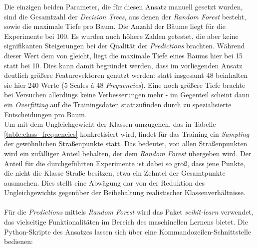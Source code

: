 Die einzigen beiden Parameter, die für diesen Ansatz manuell gesetzt wurden, sind die Gesamtzahl der \textit{Decision Trees}, aus denen der \textit{Random Forest} besteht, sowie die maximale Tiefe pro Baum. Die Anzahl der Bäume liegt für die Experimente bei 100. Es wurden auch höhere Zahlen getestet, die aber keine signifikanten Steigerungen bei der Qualität der \textit{Predictions} brachten. Während dieser Wert dem von \cite{Zhiqiang.etal-2019} gleicht, liegt die maximale Tiefe eines Baums hier bei 15 statt bei 10. Dies kann damit begründet werden, dass im vorliegenden Ansatz deutlich größere Featurevektoren genutzt werden: statt insgesamt 48 beinhalten sie hier 240 Werte (5 Scales á 48 \textit{Frequencies}). Eine noch größere Tiefe brachte bei Versuchen allerdings keine Verbesserungen mehr - im Gegenteil scheint dann ein \textit{Overfitting} auf die Trainingsdaten stattzufinden durch zu spezialisierte Entscheidungen pro Baum. \\
Um mit dem Ungleichgewicht der Klassen umzugehen, das in Tabelle \ref{table:class_frequencies} konkretisiert wird, findet für das Training ein \textit{Sampling} der gewöhnlichen Straßenpunkte statt. Das bedeutet, von allen Straßenpunkten wird ein zufälliger Anteil behalten, der dem \textit{Random Forest} übergeben wird. Der Anteil für die durchgeführten Experimente ist dabei so groß, dass jene Punkte, die nicht die Klasse Straße besitzen, etwa ein Zehntel der Gesamtpunkte ausmachen. Dies stellt eine Abwägung dar von der Reduktion des Ungleichgewichts gegenüber der Beibehaltung realistischer Klassenverhältnisse. \\\\
Für die \textit{Predictions} mittels \textit{Random Forest} wird das Paket \textit{scikit-learn} verwendet, das vielseitige Funktionalitäten im Bereich des maschinellen Lernens bietet. Die Python-Skripte des Ansatzes lassen sich über eine Kommandozeilen-Schnittstelle bedienen:
